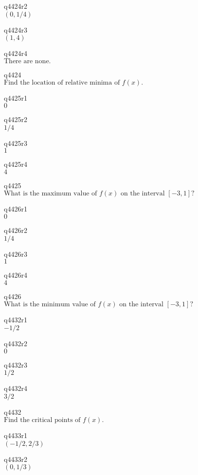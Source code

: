 q4424r2\\
\(\displaystyle (0, 1/4) \)

q4424r3\\
\(\displaystyle (1, 4) \)

q4424r4\\
\(\displaystyle \text{There are none.} \)

q4424\\
\(\displaystyle \text{Find the location of relative minima of } f(x). \)

q4425r1\\
\(\displaystyle 0 \)

q4425r2\\
\(\displaystyle 1/4 \)

q4425r3\\
\(\displaystyle 1 \)

q4425r4\\
\(\displaystyle 4 \)

q4425\\
\(\displaystyle \text{What is the maximum value of } f(x) \text{ on the interval } [-3, 1]? \)

q4426r1\\
\(\displaystyle 0 \)

q4426r2\\
\(\displaystyle 1/4 \)

q4426r3\\
\(\displaystyle 1 \)

q4426r4\\
\(\displaystyle 4 \)

q4426\\
\(\displaystyle \text{What is the minimum value of } f(x) \text{ on the interval } [-3, 1]? \)

q4432r1\\
\(\displaystyle -1/2 \)

q4432r2\\
\(\displaystyle 0 \)

q4432r3\\
\(\displaystyle 1/2 \)

q4432r4\\
\(\displaystyle 3/2 \)

q4432\\
\(\displaystyle \text{Find the critical points of } f(x). \)

q4433r1\\
\(\displaystyle (-1/2, 2/3) \)

q4433r2\\
\(\displaystyle (0, 1/3) \)

